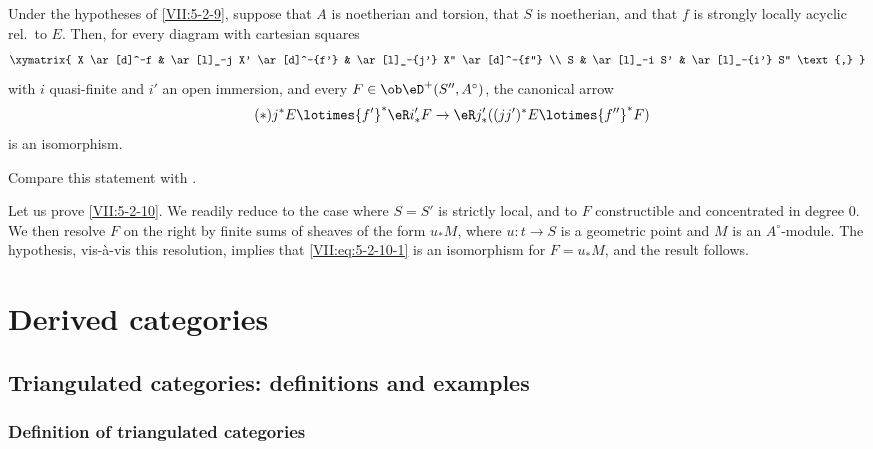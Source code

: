 \documentclass[oneside]{book}
\begin{document}
\begin{proposition}\label{VII:5-2-10}
Under the hypotheses of \ref{VII:5-2-9}, suppose that $A$ is noetherian and
torsion, that $S$ is noetherian, and that $f$ is strongly locally acyclic
rel.\ to $E$. Then, for every diagram with cartesian squares
\[\xymatrix{
  X \ar[d]^-f 
    & \ar[l]_-j X' \ar[d]^-{f'} 
    & \ar[l]_-{j'} X'' \ar[d]^-{f''} \\
  S 
    & \ar[l]_-i S' 
    & \ar[l]_-{i'} S'' \text{,} 
}\]
with $i$ quasi-finite and $i'$ an open immersion, and every
$F\in\ob\eD^+(S'',A^\circ)$, the canonical arrow
\begin{equation*}\tag{$*$}\label{VII:eq:5-2-10-1}
  j^\ast E \lotimes {f'}^\ast \eR i'_\ast F \to \eR j'_\ast ((j j')^\ast E\lotimes {f''}^\ast F) 
\end{equation*}
is an isomorphism.
\end{proposition}

Compare this statement with \cite[XV 1.17]{sga4}.

Let us prove \ref{VII:5-2-10}. We readily reduce to the case where $S=S'$ is
strictly local, and to $F$ constructible and concentrated in degree $0$. We then
resolve $F$ on the right by finite sums of sheaves of the form $u_\ast M$,
where $u:t\to S$ is a geometric point and $M$ is an $A^\circ$-module. The
hypothesis, vis-\`a-vis this resolution, implies that
\eqref{VII:eq:5-2-10-1} is an isomorphism for $F=u_\ast M$, and the result
follows.



\chapter{Derived categories}\label{VIII}

\section{Triangulated categories: definitions and examples}\label{VIII:1}

\subsection{Definition of triangulated categories}\label{VIII:1-1}

\addtocounter{subsubsection}{-1}
\end{document}

